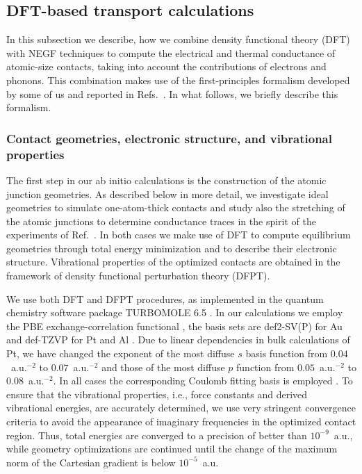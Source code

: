 \documentclass[aps,amsmath,amssymb,twocolumn,showpacs]{revtex4-1}
\begin{document}
\subsection{DFT-based transport calculations}

In this subsection we describe, how we combine density functional theory (DFT)
with NEGF techniques to compute the electrical and thermal conductance of
atomic-size contacts, taking into account the contributions of electrons and 
phonons. This combination makes use of the first-principles formalism developed 
by some of us and reported in Refs.~. In what 
follows, we briefly describe this formalism.
   
\subsubsection{Contact geometries, electronic structure, and vibrational
  properties} \label{sec-CGESVP}

The first step in our ab initio calculations is the construction of the atomic
junction geometries. As described below in more detail, we investigate ideal
geometries to simulate one-atom-thick contacts and study also the stretching
of the atomic junctions to determine conductance traces in the spirit of the
experiments of Ref.~. In both cases we make use of DFT to
compute equilibrium geometries through total energy minimization and to
describe their electronic structure. Vibrational properties of the optimized
contacts are obtained in the framework of density functional perturbation
theory (DFPT).

We use both DFT and DFPT procedures, as implemented in the quantum chemistry 
software package TURBOMOLE 6.5 \cite{TURBOMOLE,Deglmann2002,Deglmann2004}. In 
our calculations we employ the PBE exchange-correlation functional
\cite{Perdew1992,Perdew1996}, the basis sets are def2-SV(P)
for Au \cite{Weigend2005} and def-TZVP for Pt and Al \cite{Schafer1994}. Due 
to linear dependencies in bulk calculations of Pt, we have changed the exponent 
of the most diffuse $s$ basis function from $0.04$~a.u.$^{-2}$ to $0.07$~a.u.$^{-2}$ 
and those of the most diffuse $p$ function from $0.05$~a.u.$^{-2}$ to $0.08$~a.u.$^{-2}$. 
In all cases the corresponding Coulomb fitting basis is employed 
\cite{Eichkorn1997,Weigend2006}. To ensure that the vibrational properties, i.e., 
force constants and derived vibrational energies, are accurately determined, we 
use very stringent convergence criteria to avoid the appearance of imaginary
frequencies in the optimized contact region. Thus, total energies are converged 
to a precision of better than $10^{-9}$~a.u., while geometry optimizations are 
continued until the change of the maximum norm of the Cartesian gradient is 
below $10^{-5}$~a.u.
\end{document}
